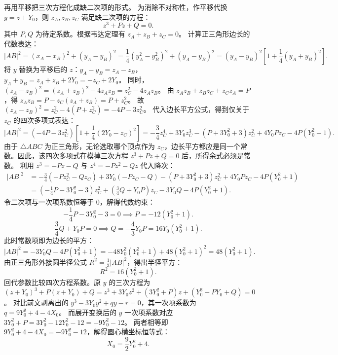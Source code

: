 \begin{solution}
再用平移把三次方程化成缺二次项的形式。
为消除不对称性，作平移代换 $y = z + Y_0$，则 $z_A, z_B, z_C$ 满足缺二次项的方程：
\[
z^3 + Pz + Q = 0.
\]
其中 $P, Q$ 为待定系数。根据韦达定理有 $z_A + z_B + z_C = 0$。
计算正三角形边长的代数表达：
\[
|AB|^2 = (x_A - x_B)^2 + (y_A - y_B)^2 = \frac{1}{4}(y_A^2 - y_B^2)^2 + (y_A - y_B)^2 = (y_A - y_B)^2 \left[ 1 + \frac{1}{4}(y_A + y_B)^2 \right].
\]
将 $y$ 替换为平移后的 $z$：$y_A - y_B = z_A - z_B$，$y_A + y_B = z_A + z_B + 2Y_0 = -z_C + 2Y_0$。
同时，$(z_A - z_B)^2 = (z_A + z_B)^2 - 4z_A z_B = z_C^2 - 4z_A z_B$。
由 $z_A z_B + z_B z_C + z_C z_A = P$，得 $z_A z_B = P - z_C(z_A + z_B) = P + z_C^2$。
故 $(z_A - z_B)^2 = z_C^2 - 4(P + z_C^2) = -4P - 3z_C^2$。
代入边长平方公式，得到仅关于 $z_C$ 的四次多项式表达：
\[
|AB|^2 = (-4P - 3z_C^2) \left[ 1 + \frac{1}{4}(2Y_0 - z_C)^2 \right] = -\frac{3}{4}z_C^4 + 3Y_0 z_C^3 - (P + 3Y_0^2 + 3)z_C^2 + 4Y_0 P z_C - 4P(Y_0^2 + 1).
\]
由于 $\triangle ABC$ 为正三角形，无论选取哪个顶点作为 $z_C$，边长平方都应是同一个常数。因此，该四次多项式在模掉三次方程 $z^3 + Pz + Q = 0$ 后，所得余式必须是常数。
利用 $z^3 = -Pz - Q$ 与 $z^4 = -Pz^2 - Qz$ 代入降次：
\begin{align*}
|AB|^2 &= -\frac{3}{4}(-Pz_C^2 - Qz_C) + 3Y_0(-Pz_C - Q) - (P + 3Y_0^2 + 3)z_C^2 + 4Y_0 P z_C - 4P(Y_0^2 + 1) \\
&= \left( -\frac{1}{4}P - 3Y_0^2 - 3 \right)z_C^2 + \left( \frac{3}{4}Q + Y_0 P \right)z_C - 3Y_0 Q - 4P(Y_0^2 + 1).
\end{align*}
令二次项与一次项系数恒等于 $0$，解得代数约束：
\[
-\frac{1}{4}P - 3Y_0^2 - 3 = 0 \implies P = -12(Y_0^2 + 1).
\]
\[
\frac{3}{4}Q + Y_0 P = 0 \implies Q = -\frac{4}{3}Y_0 P = 16Y_0(Y_0^2 + 1).
\]
此时常数项即为边长的平方：
\[
|AB|^2 = -3Y_0 Q - 4P(Y_0^2 + 1) = -48Y_0^2(Y_0^2 + 1) + 48(Y_0^2 + 1)^2 = 48(Y_0^2 + 1).
\]
由正三角形外接圆半径公式 $R^2 = \frac{1}{3}|AB|^2$，得出半径平方：
\[
R^2 = 16(Y_0^2 + 1).
\]
回代参数比较四次方程系数。原 $y$ 的三次方程为 $(z+Y_0)^3 + P(z+Y_0) + Q = z^3 + 3Y_0 z^2 + (3Y_0^2 + P)z + (Y_0^3 + P Y_0 + Q) = 0$。
对比前文剥离出的 $y^3 - 3Y_0 y^2 + qy - r = 0$，其一次项系数为 $q = 9Y_0^2 + 4 - 4X_0$。
而展开变换后的 $y$ 一次项系数对应 $3Y_0^2 + P = 3Y_0^2 - 12Y_0^2 - 12 = -9Y_0^2 - 12$。
两者相等即 $9Y_0^2 + 4 - 4X_0 = -9Y_0^2 - 12$，解得圆心横坐标恒等式：
\[
X_0 = \frac{9}{2}Y_0^2 + 4.
\]


\end{solution}
